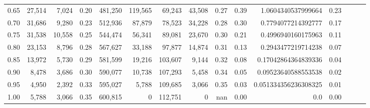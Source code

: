 \begin{tabular}{rrrrrrrrrrrrrrr}
0.65 &  27,514 &   7,024 &  0.20 &  481,250 &  119,565 &   69,243 &   43,508 &  0.27 &  0.39 &    1.0604340537999664 &      0.23 \\
0.70 &  31,686 &   9,280 &  0.23 &  512,936 &   87,879 &   78,523 &   34,228 &  0.28 &  0.30 &    0.7794077214392777 &      0.17 \\
0.75 &  31,538 &  10,558 &  0.25 &  544,474 &   56,341 &   89,081 &   23,670 &  0.30 &  0.21 &    0.4996940160175963 &      0.11 \\
0.80 &  23,153 &   8,796 &  0.28 &  567,627 &   33,188 &   97,877 &   14,874 &  0.31 &  0.13 &    0.2943477219714238 &      0.07 \\
0.85 &  13,972 &   5,730 &  0.29 &  581,599 &   19,216 &  103,607 &    9,144 &  0.32 &  0.08 &   0.17042864364839336 &      0.04 \\
0.90 &   8,478 &   3,686 &  0.30 &  590,077 &   10,738 &  107,293 &    5,458 &  0.34 &  0.05 &   0.09523640588553538 &      0.02 \\
0.95 &   4,950 &   2,392 &  0.33 &  595,027 &    5,788 &  109,685 &    3,066 &  0.35 &  0.03 &  0.051334356236308325 &      0.01 \\
1.00 &   5,788 &   3,066 &  0.35 &  600,815 &        0 &  112,751 &        0 &   nan &  0.00 &                   0.0 &      0.00 \\
\bottomrule
\end{tabular}
